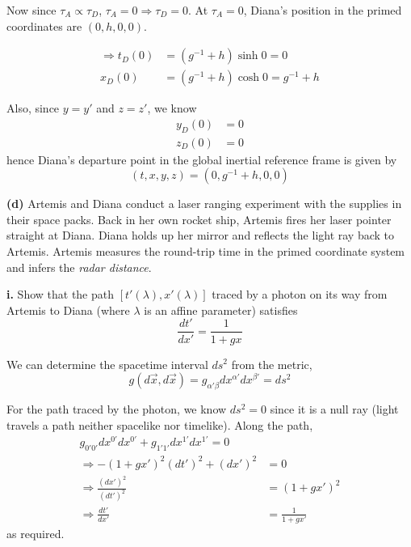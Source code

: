 \documentclass[a4paper]{article} %
\begin{document}
Now since $\tau_A\propto \tau_D$, $\tau_A=0\Rightarrow \tau_D=0$. At $\tau_A=0$, Diana's position in the primed coordinates are $(0,h,0,0)$.

\begin{align}
\Rightarrow t_D(0)&=(g^{-1}+h)\sinh 0=0\\
x_D(0)&=(g^{-1}+h)\cosh 0 = g^{-1}+h
\end{align}

Also, since $y=y'$ and $z=z'$, we know
\begin{align}
y_D(0)&=0\\
z_D(0)&=0
\end{align}
hence Diana's departure point in the global inertial reference frame is given by
\begin{equation}
(t,x,y,z)=(0,g^{-1}+h,0,0)
\end{equation}


\begin{framed}
\textbf{(d)} Artemis and Diana conduct a laser ranging experiment with the supplies in their space packs. Back in her own rocket ship, Artemis fires her laser pointer straight at Diana. Diana holds up her mirror and reflects the light ray back to Artemis. Artemis measures the round-trip time in the primed coordinate system and infers the \emph{radar distance}.
\end{framed}

\begin{framed}
\textbf{i.} Show that the path $[t'(\lambda),x'(\lambda)]$ traced by a photon on its way from Artemis to Diana (where $\lambda$ is an affine parameter) satisfies
\begin{equation}
\frac{dt'}{dx'}=\frac{1}{1+gx}\label{di. eq1}
\end{equation}
\end{framed}

We can determine the spacetime interval $ds^2$ from the metric,
\begin{equation}
g(d\vec{x},d\vec{x})=g_{\alpha'\beta}dx^{\alpha'}dx^{\beta'}=ds^2
\end{equation}

For the path traced by the photon, we know $ds^2=0$ since it is a null ray (light travels a path neither spacelike nor timelike). Along the path,
\begin{align}
g_{0'0'}dx^{0'}dx^{0'}+g_{1'1'}dx^{1'}dx^{1'}=0\\
\Rightarrow -(1+gx')^2(dt')^2+(dx')^2&=0\\
\Rightarrow \frac{(dx')^2}{(dt')^2}&=(1+gx')^2\\
\Rightarrow \frac{dt'}{dx'}&=\frac{1}{1+gx'}
\end{align}
as required.
\end{document}
